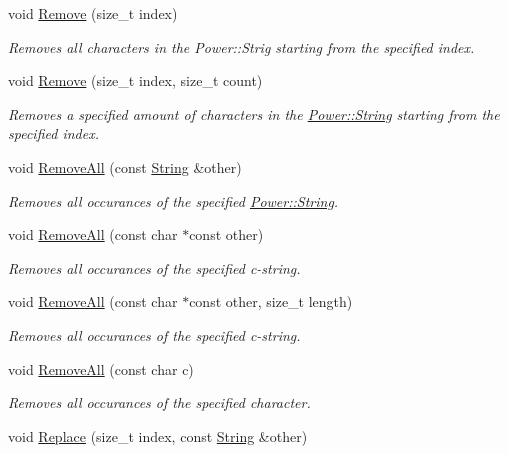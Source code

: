 \begin{DoxyCompactItemize}
void \hyperlink{class_power_1_1_string_a74417c6d558225c4bbd8e51128dc64fc}{Remove} (size\+\_\+t index)
\begin{DoxyCompactList}\small\item\em Removes all characters in the Power\+::\+Strig starting from the specified index. \end{DoxyCompactList}\item 
void \hyperlink{class_power_1_1_string_ae54d14f87fd2d2e66334697ea1a740a7}{Remove} (size\+\_\+t index, size\+\_\+t count)
\begin{DoxyCompactList}\small\item\em Removes a specified amount of characters in the \hyperlink{class_power_1_1_string}{Power\+::\+String} starting from the specified index. \end{DoxyCompactList}\item 
void \hyperlink{class_power_1_1_string_a0189bdb52b19b0f9e7929cb87b2fd66c}{Remove\+All} (const \hyperlink{class_power_1_1_string}{String} \&other)
\begin{DoxyCompactList}\small\item\em Removes all occurances of the specified \hyperlink{class_power_1_1_string}{Power\+::\+String}. \end{DoxyCompactList}\item 
void \hyperlink{class_power_1_1_string_a1b237c81ea2a466c192cdd63e706f455}{Remove\+All} (const char $\ast$const other)
\begin{DoxyCompactList}\small\item\em Removes all occurances of the specified c-\/string. \end{DoxyCompactList}\item 
void \hyperlink{class_power_1_1_string_a6418c5e3a28ef177a3516c17be3bfcb3}{Remove\+All} (const char $\ast$const other, size\+\_\+t length)
\begin{DoxyCompactList}\small\item\em Removes all occurances of the specified c-\/string. \end{DoxyCompactList}\item 
void \hyperlink{class_power_1_1_string_ac1a456c7f0f019263c424431b0fbeefa}{Remove\+All} (const char c)
\begin{DoxyCompactList}\small\item\em Removes all occurances of the specified character. \end{DoxyCompactList}\item 
void \hyperlink{class_power_1_1_string_a8fc1e2630c8ce27765589c7cf8cce1d7}{Replace} (size\+\_\+t index, const \hyperlink{class_power_1_1_string}{String} \&other)

\end{DoxyCompactItemize}
